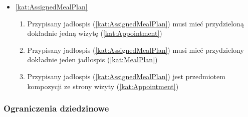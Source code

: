 \begin{itemize}[label={\textbf{Reguły dla}}, wide, labelwidth=!, labelindent=0pt]
    \item\ref{kat:AssignedMealPlan}\mynobreakpar
    \begin{enumerate}[label={\textbf{REG/4/\protect\twodigits{\arabic{enumi}}}}, wide, labelwidth=!, align=left, leftmargin=3cm, resume]
        \item Przypisany jadłospis (\ref{kat:AssignedMealPlan}) musi mieć przydzieloną dokładnie jedną wizytę (\ref{kat:Appointment})
        \item Przypisany jadłospis (\ref{kat:AssignedMealPlan}) musi mieć przydzielony dokładnie jeden jadłospis (\ref{kat:MealPlan})
        \item Przypisany jadłospis (\ref{kat:AssignedMealPlan}) jest przedmiotem kompozycji ze strony wizyty (\ref{kat:Appointment})
    \end{enumerate}
\end{itemize}

\subsubsection{Ograniczenia dziedzinowe}\label{subsubsec:database:appointments:restrictions}


